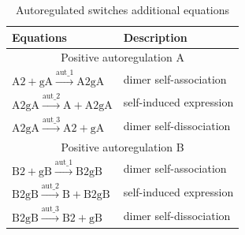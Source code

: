\begin{table}[htbp]
\centering
\caption{Autoregulated switches additional equations}
\label{tab:autoreg_equs}
\begin{tabular}{@{}ll@{}}
\toprule
Equations                                                                              & Description             \\ \midrule
\multicolumn{2}{c}{ Positive autoregulation A}                                                                 \\
$\textrm{A2} + \textrm{gA} \stackrel{\textrm{aut\_1}}{\longrightarrow} \textrm{A2gA}$  & dimer self-association  \\
$\textrm{A2gA} \stackrel{\textrm{aut\_2}}{\longrightarrow} \textrm{A} + \textrm{A2gA}$ & self-induced expression \\
$\textrm{A2gA} \stackrel{\textrm{aut\_3}}{\longrightarrow} \textrm{A2}+ \textrm{gA}$   & dimer self-dissociation \\
\multicolumn{2}{c}{Positive autoregulation B}                                                                    \\
$\textrm{B2} + \textrm{gB} \stackrel{\textrm{aut\_1}}{\longrightarrow} \textrm{B2gB}$  & dimer self-association  \\
$\textrm{B2gB} \stackrel{\textrm{aut\_2}}{\longrightarrow} \textrm{B} + \textrm{B2gB}$ & self-induced expression \\
$\textrm{B2gB} \stackrel{\textrm{aut\_3}}{\longrightarrow} \textrm{B2}+ \textrm{gB}$   & dimer self-dissociation \\ \bottomrule
\end{tabular}
\end{table}
%
%
%

